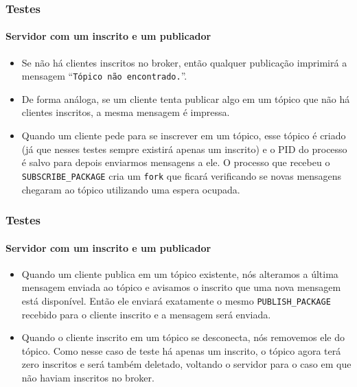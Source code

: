 \documentclass[10pt]{beamer}
\begin{document}
    \begin{frame}[t]
      \frametitle{Testes}
      \framesubtitle{Servidor com um inscrito e um publicador}
      \begin{itemize}
        \item Se não há clientes inscritos no broker, então qualquer publicação
          imprimirá a mensagem  ``\texttt{Tópico não encontrado.}''.
        \item De forma análoga, se um cliente tenta publicar algo em um tópico
          que não há clientes inscritos, a mesma mensagem é impressa.
        \item Quando um cliente pede para se inscrever em um tópico, esse tópico
          é criado (já que nesses testes sempre existirá apenas um inscrito) e
          o PID do processo é salvo para depois enviarmos mensagens a ele.
          O processo que recebeu o \texttt{SUBSCRIBE\_PACKAGE} cria um
          \texttt{fork} que ficará verificando se novas mensagens chegaram ao
          tópico utilizando uma espera ocupada.
      \end{itemize}
    \end{frame}

    \begin{frame}[t]
      \frametitle{Testes}
      \framesubtitle{Servidor com um inscrito e um publicador}
      \begin{itemize}
        \item Quando um cliente publica em um tópico existente, nós alteramos a
          última mensagem enviada ao tópico e avisamos o inscrito que uma nova
          mensagem está disponível. Então ele enviará exatamente o mesmo
          \texttt{PUBLISH\_PACKAGE} recebido para o cliente inscrito e a
          mensagem será enviada.
        \item Quando o cliente inscrito em um tópico se desconecta, nós
          removemos ele do tópico. Como nesse caso de teste há apenas um
          inscrito, o tópico agora terá zero inscritos e será também deletado,
          voltando o servidor para o caso em que não haviam inscritos no broker.
      \end{itemize}
    \end{frame}
\end{document}
